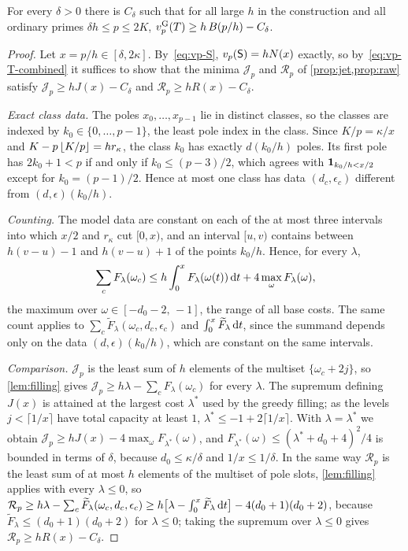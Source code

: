 \begin{proposition}\label{prop:profile}
For every $\delta>0$ there is $C_\delta$ such that for all large $h$ in the construction and all
ordinary primes $\delta h\le p\le2K$, $v_{p}^{\mathrm{G}}(T)\ge h\,B(p/h)-C_\delta$.
\end{proposition}

\begin{proof}
Let $x=p/h\in[\delta,2\kappa]$. By~\eqref{eq:vp-S}, $v_p(\mathsf{S})=hN(x)$ exactly, so
by~\eqref{eq:vp-T-combined} it suffices to show that the minima $\mathcal J_p$ and $\mathcal R_p$
of \cref{prop:jet,prop:raw} satisfy $\mathcal J_p\ge hJ(x)-C_\delta$ and
$\mathcal R_p\ge hR(x)-C_\delta$.

\emph{Exact class data.} The poles $x_0,\dots,x_{p-1}$ lie in distinct classes, so the classes are
indexed by $k_0\in\{0,\dots,p-1\}$, the least pole index in the class. Since $K/p=\kappa/x$ and
$K-p\left\lfloor K/p\right\rfloor=hr_\kappa$, the class $k_0$ has exactly $d(k_0/h)$ poles. Its first pole has
$2k_0+1<p$ if and only if $k_0\le(p-3)/2$, which agrees with $\mathbf{1}_{k_0/h<x/2}$ except for
$k_0=(p-1)/2$. Hence at most one class has data $(d_c,\epsilon_c)$ different from
$(d,\epsilon)(k_0/h)$.

\emph{Counting.} The model data are constant on each of the at most three intervals into which
$x/2$ and $r_\kappa$ cut $[0,x)$, and an interval $[u,v)$ contains between $h(v-u)-1$ and
$h(v-u)+1$ of the points $k_0/h$. Hence, for every $\lambda$,
\[
  \sum_cF_\lambda(\omega_c)\le h\int_0^xF_\lambda(\omega(t))\,\mathrm{d} t+4\max_\omega F_\lambda(\omega),
\]
the maximum over $\omega\in[-d_0-2,\,-1]$, the range of all base costs. The same count applies to
$\sum_c\widetilde F_\lambda(\omega_c,d_c,\epsilon_c)$ and $\int_0^x\widetilde F_\lambda\,\mathrm{d} t$, since the summand
depends only on the data $(d,\epsilon)(k_0/h)$, which are constant on the same intervals.

\emph{Comparison.} $\mathcal J_p$ is the least sum of $h$ elements of the multiset
$\{\omega_c+2j\}$, so \cref{lem:filling} gives $\mathcal J_p\ge h\lambda-\sum_cF_\lambda(\omega_c)$
for every $\lambda$. The supremum defining $J(x)$ is attained at the largest cost $\lambda^*$ used
by the greedy filling; as the levels $j<\lceil1/x\rceil$ have total capacity at least $1$,
$\lambda^*\le-1+2\lceil1/x\rceil$. With $\lambda=\lambda^*$ we obtain $\mathcal J_p\ge
hJ(x)-4\max_\omega F_{\lambda^*}(\omega)$, and $F_{\lambda^*}(\omega)\le(\lambda^*+d_0+4)^2/4$ is
bounded in terms of $\delta$, because $d_0\le\kappa/\delta$ and $1/x\le1/\delta$. In the same way
$\mathcal R_p$ is the least sum of at most $h$ elements of the multiset of pole slots,
\cref{lem:filling} applies with every $\lambda\le0$, so $\mathcal R_p\ge h\lambda-\sum_c\widetilde F_\lambda(\omega_c,d_c,\epsilon_c)\ge h\bigl[\lambda-\int_0^x\widetilde F_\lambda\,\mathrm{d} t\bigr]-4(d_0+1)(d_0+2)$,
because $\widetilde F_\lambda\le(d_0+1)(d_0+2)$ for $\lambda\le0$; taking the supremum over $\lambda\le0$ gives
$\mathcal R_p\ge hR(x)-C_\delta$.
\end{proof}

